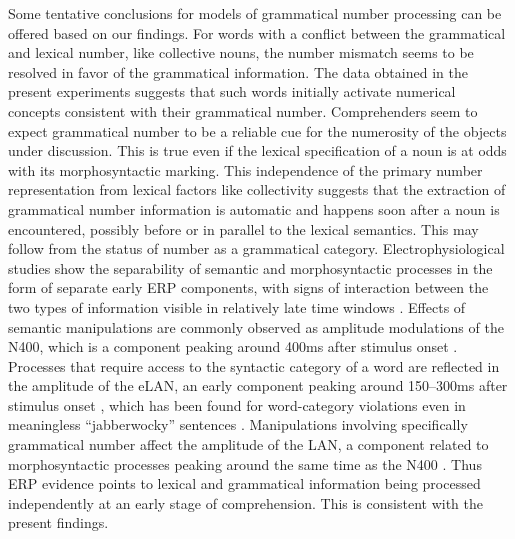 \documentclass[output=paper]{langscibook}
\begin{document}
Some tentative conclusions for models of grammatical number processing can be offered based on our findings. For words with a conflict between the grammatical and lexical number, like collective nouns, the number mismatch seems to be resolved in favor of the grammatical information. The data obtained in the present experiments suggests that such words initially activate numerical concepts consistent with their grammatical number. Comprehenders seem to expect grammatical number to be a reliable cue for the numerosity of the objects under discussion. This is true even if the lexical specification of a noun is at odds with its morphosyntactic marking. This independence of the primary number representation from lexical factors like collectivity suggests that the extraction of grammatical number information is automatic and happens soon after a noun is encountered, possibly before or in parallel to the lexical semantics. This may follow from the status of number as a grammatical category. Electrophysiological studies show the separability of semantic and morphosyntactic processes in the form of separate early ERP components, with signs of interaction between the two types of information visible in relatively late time windows \citep{aFriedericineuralbasisauditory2002}. Effects of semantic manipulations are commonly observed as amplitude modulations of the N400, which is a component peaking around 400ms after stimulus onset \citep{aKutasThirtyyearscounting2011}. Processes that require access to the syntactic category of a word are reflected in the amplitude of the eLAN, an early component peaking around 150--300ms after stimulus onset \citep{aHahneElectrophysiologicalevidencetwo1999}, which has been found for word-category violations even in meaningless “jabberwocky” sentences \citep{aHahneWhatleftif2001}. Manipulations involving specifically grammatical number affect the amplitude of the LAN, a component related to morphosyntactic processes \citep{munteBrainActivityAssociated1997,friedericiTimeCourseSyntactic1995} peaking around the same time as the N400 \citep{aBarberGrammaticalgendernumber2005,aLuckBrainpotentialsmorphologically2006}.\footnotemark{} Thus ERP evidence points to lexical and grammatical information being processed independently at an early stage of comprehension. This is consistent with the present findings.
\end{document}
